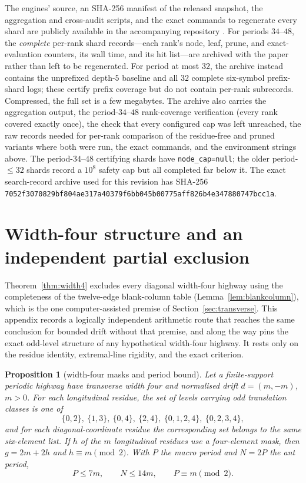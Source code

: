 \documentclass[11pt,reqno]{amsart}
\theoremstyle{plain}
\newtheorem{proposition}[theorem]{Proposition}
\theoremstyle{definition}
\newcommand{\drift}{d}
\newcommand{\growth}{g}
\begin{document}
The engines' source, an SHA-256 manifest of the released snapshot, the aggregation
and cross-audit scripts, and the exact commands to regenerate every shard are publicly
available in the accompanying repository \cite{Repo}. For periods $34$--$48$, the
\emph{complete} per-rank shard records---each rank's node, leaf, prune, and
exact-evaluation counters, its wall time, and its hit list---are archived with the
paper rather than left to be regenerated. For period at most $32$, the archive instead
contains the unprefixed depth-$5$ baseline and all $32$ complete six-symbol prefix-shard
logs; these certify prefix coverage but do not contain per-rank subrecords. Compressed,
the full set is a few megabytes.
The archive also carries the aggregation output, the period-$34$--$48$ rank-coverage
verification (every rank covered exactly once), the
check that every configured cap was left unreached, the raw records needed for
per-rank comparison of the residue-free and pruned variants where both were run, the
exact commands, and the
environment strings above. The period-$34$--$48$ certifying shards have
\texttt{node\_cap=null}; the older period-$\le32$ shards record a $10^8$ safety cap
but all completed far below it. The exact search-record archive used for this revision
has SHA-256
\texttt{7052f3070829bf804ae317a40379f6bb045b00775aff826b4e347880747bcc1a}.

\section{Width-four structure and an independent partial exclusion}\label{app:width4arith}

Theorem~\ref{thm:width4} excludes every diagonal width-four highway using the
completeness of the twelve-edge blank-column table (Lemma~\ref{lem:blankcolumn}),
which is the one computer-assisted premise of Section~\ref{sec:transverse}. This
appendix records a logically independent arithmetic route that reaches the same
conclusion for bounded drift without that premise, and along the way pins the exact
odd-level structure of any hypothetical width-four highway. It rests only on the
residue identity, extremal-line rigidity, and the exact criterion.

\begin{proposition}[width-four masks and period bound]\label{prop:width4arithmetic}
Let a finite-support periodic highway have transverse width four and normalised drift
$\drift=(m,-m)$, $m>0$. For each longitudinal residue, the set of levels carrying odd
translation classes is one of
\[
\{0,2\},\ \{1,3\},\ \{0,4\},\ \{2,4\},\ \{0,1,2,4\},\ \{0,2,3,4\},
\]
and for each diagonal-coordinate residue the corresponding set belongs to the same
six-element list. If $h$ of the $m$ longitudinal residues use a four-element mask,
then $\growth=2m+2h$ and $h\equiv m\pmod2$. With $P$ the macro period and $N=2P$ the
ant period,
\[
P\le 7m,\qquad N\le 14m,\qquad P\equiv m\pmod2.
\]
\end{proposition}
\end{document}
